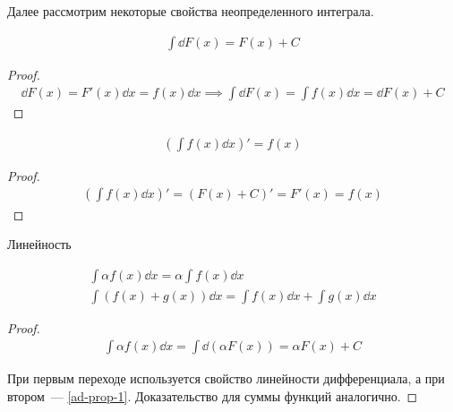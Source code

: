 Далее рассмотрим некоторые свойства неопределенного интеграла.

\begin{lemma}\label{ad-prop-1}
  \begin{align*}
    \int \dd F(x) = F(x) + C
  \end{align*}
\end{lemma}
\begin{proof}
  \begin{align*}
    \dd F(x) = F'(x) \dd x = f(x) \dd x
    \implies
    \int \dd F(x) = \int f(x) \dd x = \dd F(x) + C
  \end{align*}
\end{proof}

\begin{lemma}\label{ad-prop-2}
  \begin{align*}
    \left( \int f(x) \dd x \right)' = f(x)
  \end{align*}
\end{lemma}
\begin{proof}
  \begin{align*}
    \left( \int f(x) \dd x \right)' = (F(x) + C)' = F'(x) = f(x)
  \end{align*}
\end{proof}

\begin{lemma}\label{ad-prop-3}
  Линейность

  \begin{align*}
    \int \alpha f(x) \dd x = \alpha \int f(x) \dd x \\
    \int (f(x) + g(x)) \dd x = \int f(x) \dd x + \int g(x) \dd x
  \end{align*}
\end{lemma}
\begin{proof}
  \begin{align*}
    \int \alpha f(x) \dd x
    = \int \dd (\alpha F(x))
    = \alpha F(x) + C
  \end{align*}

  При первым переходе используется свойство линейности дифференциала,
  а при втором~--- \ref{ad-prop-1}. Доказательство для суммы функций аналогично.
\end{proof}
